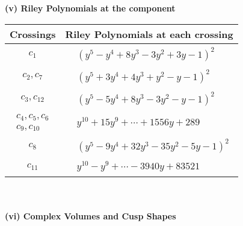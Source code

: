 \documentclass[1p]{elsarticle_modified}
\theoremstyle{definition}
\begin{document}
\newpage\renewcommand{\arraystretch}{1}
\flushleft \textbf{(v) Riley Polynomials at the component}\newline \\
\begin{tabular}{m{50pt}|m{274pt}}
Crossings & \hspace{64pt}Riley Polynomials at each crossing \\
\hline $$\begin{aligned}c_{1}\end{aligned}$$&$\begin{aligned}
&(y^5- y^4+8 y^3-3 y^2+3 y-1)^2
\end{aligned}$\\
\hline $$\begin{aligned}c_{2},c_{7}\end{aligned}$$&$\begin{aligned}
&(y^5+3 y^4+4 y^3+y^2- y-1)^2
\end{aligned}$\\
\hline $$\begin{aligned}c_{3},c_{12}\end{aligned}$$&$\begin{aligned}
&(y^5-5 y^4+8 y^3-3 y^2- y-1)^2
\end{aligned}$\\
\hline $$\begin{aligned}c_{4},c_{5},c_{6}\\c_{9},c_{10}\end{aligned}$$&$\begin{aligned}
&y^{10}+15 y^9+\cdots+1556 y+289
\end{aligned}$\\
\hline $$\begin{aligned}c_{8}\end{aligned}$$&$\begin{aligned}
&(y^5-9 y^4+32 y^3-35 y^2-5 y-1)^2
\end{aligned}$\\
\hline $$\begin{aligned}c_{11}\end{aligned}$$&$\begin{aligned}
&y^{10}- y^9+\cdots-3940 y+83521
\end{aligned}$\\
\hline
\end{tabular}\\~\\
\newpage\flushleft \textbf{(vi) Complex Volumes and Cusp Shapes}
\end{document}
